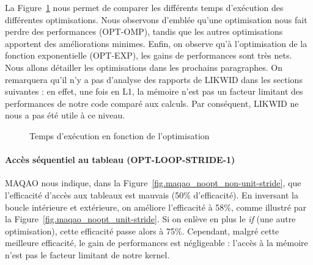 \documentclass[12pt,a4paper]{article}
\begin{document}
La Figure~\ref{fig.compare-optims} nous permet de comparer les différents temps
d'exécution des différentes optimisations. Nous observons d'emblée qu'une
optimisation nous fait perdre des performances (OPT-OMP), tandis que les autres
optimisations apportent des améliorations minimes. Enfin, on observe qu'à
l'optimisation de la fonction exponentielle (OPT-EXP), les gains de performances
sont très nets. Nous allons détailler les optimisations dans les prochains
paragraphes. On remarquera qu'il n'y a pas d'analyse des rapports de LIKWID dans
les sections suivantes : en effet, une fois en L1, la mémoire n'est pas un
facteur limitant des performances de notre code comparé aux calculs. Par
conséquent, LIKWID ne nous a pas été utile à ce niveau.
\begin{figure}[ht]
    \begin{center}
        \caption{Temps d'exécution en fonction de l'optimisation}
        \label{fig.compare-optims}
    \end{center}
\end{figure}

\paragraph{Accès séquentiel au tableau (OPT-LOOP-STRIDE-1)} MAQAO nous indique,
dans la Figure~\ref{fig.maqao_noopt_non-unit-stride}, que l'efficacité d'accès
aux tableaux est mauvais (50\% d'efficacité). En inversant la boucle intérieure
et extérieure, on améliore l'efficacité à 58\%, comme illustré par la
Figure~\ref{fig.maqao_noopt_unit-stride}. Si on enlève en plus le \textit{if}
(une autre optimisation), cette efficacité passe alors à 75\%. Cependant, malgré
cette meilleure efficacité, le gain de performances est négligeable : l'accès à la
mémoire n'est pas le facteur limitant de notre kernel.
\end{document}
